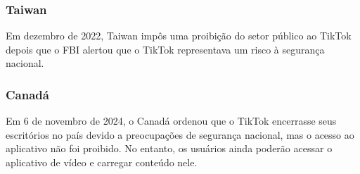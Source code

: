 \subsubsection{Taiwan}

Em dezembro de 2022, Taiwan impôs uma proibição do setor público ao TikTok depois que o FBI alertou que o TikTok representava um risco à segurança nacional.


\subsubsection{Canadá}
Em 6 de novembro de 2024, o Canadá ordenou que o TikTok encerrasse seus escritórios no país devido a preocupações de segurança nacional, mas o acesso ao aplicativo não foi proibido. No entanto, os usuários ainda poderão acessar o aplicativo de vídeo e carregar conteúdo nele.







